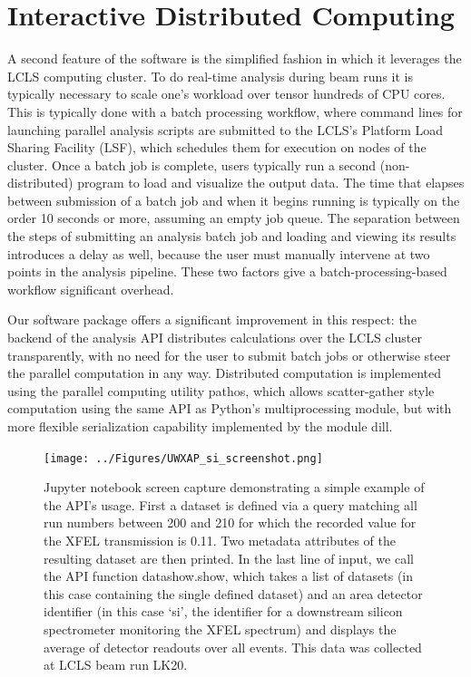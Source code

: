 \section{Interactive Distributed Computing}
A second feature of the software is the simplified fashion in which it leverages the LCLS computing cluster. To do real-time analysis during beam runs it is typically necessary to scale one's workload over tensor hundreds of CPU cores. This is typically done with a batch processing workflow, where command lines for launching parallel analysis scripts are submitted to the LCLS's Platform Load Sharing Facility (LSF), which schedules them for execution on nodes of the cluster. Once a batch job is complete, users typically run a second (non-distributed) program to load and visualize the output data. The time that elapses between submission of a batch job and when it begins running is typically on the order 10 seconds or more, assuming an empty job queue. The separation between the steps of submitting an analysis batch job and loading and viewing its results introduces a delay as well, because the user must manually intervene at two points in the analysis pipeline. These two factors give a batch-processing-based workflow significant overhead. 

Our software package offers a significant improvement in this respect: the backend of the analysis API distributes calculations over the LCLS cluster transparently, with no need for the user to submit batch jobs or otherwise steer the parallel computation in any way. Distributed computation is implemented using the parallel computing utility pathos, which allows scatter-gather style computation using the same API as Python's multiprocessing module, but with more flexible serialization capability implemented by the module dill. 


\begin{figure}[h] \label{uwxap_screenshot}
\caption{Jupyter notebook screen capture demonstrating a simple example of the API's usage. First a dataset is defined via a query matching all run numbers between 200 and 210 for which the recorded value for the XFEL transmission is 0.11. Two metadata attributes of the resulting dataset are then printed. In the last line of input, we call the API function datashow.show, which takes a list of datasets (in this case containing the single defined dataset) and an area detector identifier (in this case `si', the identifier for a downstream silicon spectrometer monitoring the XFEL spectrum) and displays the average of detector readouts over all events. This data was collected at LCLS beam run LK20. }
\centering
\texttt{[image: ../Figures/UWXAP\_si\_screenshot.png]}
\end{figure}

